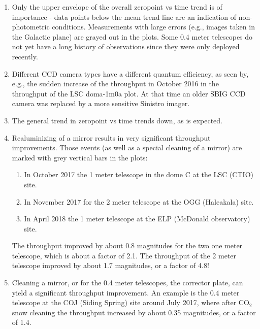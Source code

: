 \documentclass[]{spieman}
\begin{document}
\begin{enumerate}

\item Only the upper envelope of the overall zeropoint vs time trend is of importance - data points
below the mean trend line are an indication of non-photometric conditions. Measurements with large
errors (e.g., images taken in the Galactic plane) are grayed out in the plots. Some 0.4 meter 
telescopes do not yet have a long history of observations since they were only deployed recently.

\item Different CCD camera types have a different quantum efficiency, as seen by, e.g., the sudden
increase of the throughput in October 2016 in the throughput of the LSC doma-1m0a plot. At that time
an older SBIG CCD camera was replaced by a more sensitive Sinistro imager.

\item The general trend in zeropoint vs time trends down, as is expected.

\item Realuminizing of a mirror results in very significant throughput improvements. Those events 
(as well as a special cleaning of a mirror) are marked with grey vertical bars in the plots:
 \begin{enumerate}
 	\item In October 2017 the 1 meter telescope in the dome C at the LSC (CTIO) site.
    \item In November 2017 for the 2 meter telescope at the OGG (Haleakala) site. 
    \item In April 2018 the 1 meter telescope at the ELP  (McDonald observatory) site.
\end{enumerate}
 The throughput improved by about 0.8 magnitudes for the two one meter telescope, which is about a 
 factor of 2.1. The throughput of the 2 meter telescope improved by about 1.7 magnitudes, or a 
 factor of 4.8!

\item Cleaning a mirror, or for the 0.4 meter telescopes, the  corrector plate, can yield
a significant throughput improvement. An example is the 0.4 meter telescope at the COJ (Siding 
Spring) site around July 2017, where after CO$_2$ snow cleaning the throughput increased by about 
0.35 magnitudes, or a factor of 1.4. 


\end{enumerate}
\end{document}
